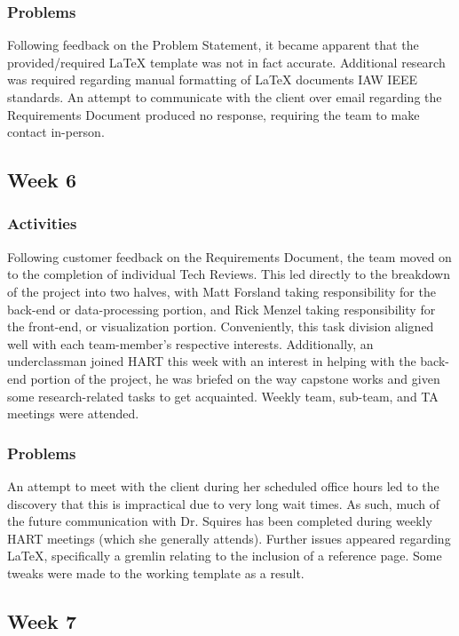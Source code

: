 \documentclass[journal,10pt,onecolumn,compsoc]{IEEEtran}
\begin{document}
		\subsubsection{Problems}
			Following feedback on the Problem Statement, it became apparent that the provided/required LaTeX template was not in fact accurate.
			Additional research was required regarding manual formatting of LaTeX documents IAW IEEE standards.
			An attempt to communicate with the client over email regarding the Requirements Document produced no response, requiring the team to make contact in-person.
		
	\subsection{Week 6}
	
		\subsubsection{Activities}
			Following customer feedback on the Requirements Document, the team moved on to the completion of individual Tech Reviews.
			This led directly to the breakdown of the project into two halves, with Matt Forsland taking responsibility for the back-end or data-processing portion, and Rick Menzel taking responsibility for the front-end, or visualization portion.
			Conveniently, this task division aligned well with each team-member's respective interests.
			Additionally, an underclassman joined HART this week with an interest in helping with the back-end portion of the project, he was briefed on the way capstone works and given some research-related tasks to get acquainted.
			Weekly team, sub-team, and TA meetings were attended.
				
		\subsubsection{Problems}
			An attempt to meet with the client during her scheduled office hours led to the discovery that this is impractical due to very long wait times. 
			As such, much of the future communication with Dr. Squires has been completed during weekly HART meetings (which she generally attends).
			Further issues appeared regarding LaTeX, specifically a gremlin relating to the inclusion of a reference page.
			Some tweaks were made to the working template as a result.
	
	\subsection{Week 7}
	
\end{document}
